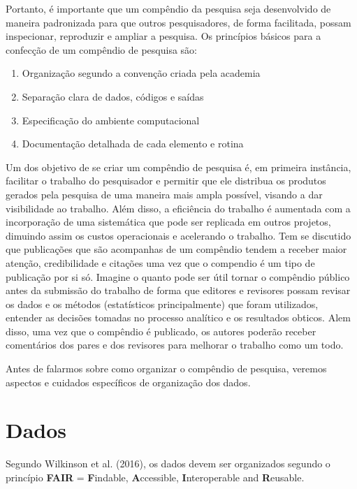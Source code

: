 \documentclass[]{book}
\providecommand{\tightlist}{%
  \setlength{\itemsep}{0pt}\setlength{\parskip}{0pt}}
\begin{document}
Portanto, é importante que um compêndio da pesquisa seja desenvolvido de
maneira padronizada para que outros pesquisadores, de forma facilitada,
possam inspecionar, reproduzir e ampliar a pesquisa. Os princípios
básicos para a confecção de um compêndio de pesquisa são:

\begin{enumerate}
\def\labelenumi{\arabic{enumi})}
\tightlist
\item
  Organização segundo a convenção criada pela academia
\item
  Separação clara de dados, códigos e saídas
\item
  Especificação do ambiente computacional
\item
  Documentação detalhada de cada elemento e rotina
\end{enumerate}

Um dos objetivo de se criar um compêndio de pesquisa é, em primeira
instância, facilitar o trabalho do pesquisador e permitir que ele
distribua os produtos gerados pela pesquisa de uma maneira mais ampla
possível, visando a dar visibilidade ao trabalho. Além disso, a
eficiência do trabalho é aumentada com a incorporação de uma sistemática
que pode ser replicada em outros projetos, dimuindo assim os custos
operacionais e acelerando o trabalho. Tem se discutido que publicações
que são acompanhas de um compêndio tendem a receber maior atenção,
credibilidade e citações uma vez que o compendio é um tipo de publicação
por si só. Imagine o quanto pode ser útil tornar o compêndio público
antes da submissão do trabalho de forma que editores e revisores possam
revisar os dados e os métodos (estatísticos principalmente) que foram
utilizados, entender as decisões tomadas no processo analítico e os
resultados obticos. Alem disso, uma vez que o compêndio é publicado, os
autores poderão receber comentários dos pares e dos revisores para
melhorar o trabalho como um todo.

Antes de falarmos sobre como organizar o compêndio de pesquisa, veremos
aspectos e cuidados específicos de organização dos dados.

\hypertarget{dados}{%
\section{Dados}\label{dados}}

Segundo Wilkinson et al. (2016), os dados devem ser organizados segundo
o princípio \textbf{FAIR} = \textbf{F}indable, \textbf{A}ccessible,
\textbf{I}nteroperable and \textbf{R}eusable.
\end{document}
